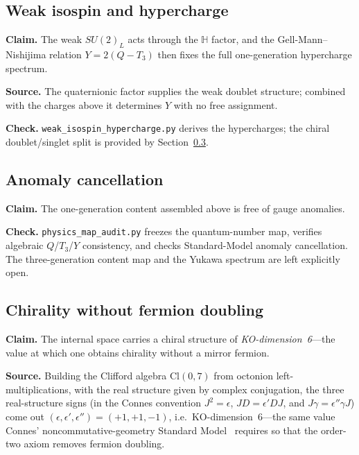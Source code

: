 \documentclass[11pt,a4paper]{article}
\theoremstyle{plain}
\newcommand{\Cl}{\mathrm{Cl}}
\newcommand{\code}[1]{\texttt{#1}}
\begin{document}
\subsection{Weak isospin and hypercharge}

\noindent\textbf{Claim.} The weak $SU(2)_L$ acts through the $\mathbb{H}$ factor,
and the Gell-Mann--Nishijima relation $Y = 2(Q - T_3)$ then fixes the full
one-generation hypercharge spectrum.

\noindent\textbf{Source.} The quaternionic factor supplies the weak doublet
structure; combined with the charges above it determines $Y$ with no free
assignment.

\noindent\textbf{Check.} \code{weak\_isospin\_hypercharge.py}
derives the hypercharges; the chiral doublet/singlet split is provided by
Section~\ref{sec:chirality}.

\subsection{Anomaly cancellation}

\noindent\textbf{Claim.} The one-generation content assembled above is free of
gauge anomalies.

\noindent\textbf{Check.} \code{physics\_map\_audit.py} freezes the quantum-number
map, verifies algebraic $Q$/$T_3$/$Y$ consistency, and checks Standard-Model
anomaly cancellation. The three-generation content map and the Yukawa spectrum are
left explicitly open.

\subsection{Chirality without fermion doubling}
\label{sec:chirality}

\noindent\textbf{Claim.} The internal space carries a chiral structure of
\emph{KO-dimension~6}---the value at which one obtains chirality without a mirror
fermion.

\noindent\textbf{Source.} Building the Clifford algebra $\Cl(0,7)$ from octonion
left-multiplications, with the real structure given by complex conjugation, the
three real-structure signs (in the Connes convention $J^2 = \epsilon$,
$JD = \epsilon' DJ$, and $J\gamma = \epsilon'' \gamma J$) come out
$(\epsilon,\epsilon',\epsilon'') = (+1,+1,-1)$, i.e.\
KO-dimension~6---the same value Connes' noncommutative-geometry Standard
Model~\cite{connes2006,chamseddine1997} requires so that the order-two axiom
removes fermion doubling.
\end{document}
